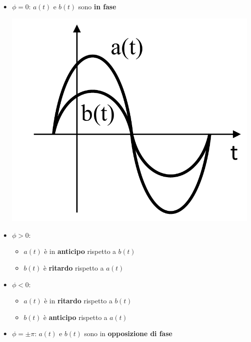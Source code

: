\documentclass{article}
\begin{document}
\begin{itemize}
    \item $\phi = 0$: $a(t)$ e $b(t)$ sono \textbf{in fase}
    \begin{center}
        \includegraphics[scale=0.2]{Image/Regime_sinusoidale_2.png}
    \end{center}
    \item $\phi >0$:
    \begin{itemize}
        \item $a(t)$ è in \textbf{anticipo} rispetto a $b(t)$
        \item $b(t)$ è \textbf{ritardo} rispetto a $a(t)$
    \end{itemize}
    \item $\phi <0$:
    \begin{itemize}
        \item $a(t)$ è in \textbf{ritardo} rispetto a $b(t)$
        \item $b(t)$ è \textbf{anticipo} rispetto a $a(t)$
    \end{itemize}
    \item $\phi = \pm \pi$: $a(t)$ e $b(t)$ sono in \textbf{opposizione di fase}
    \begin{center}

\end{center}
\end{itemize}
\end{document}
